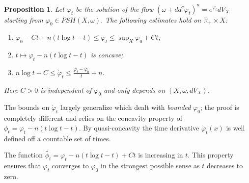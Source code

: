 \documentclass[10pt,a4paper]{amsart}
\numberwithin{equation}{section}
\newtheorem{prop}[theorem]{Proposition}
\newcommand{\R}{\mathbb R}
\newcommand{\f}{\varphi}
\begin{document}
\begin{prop} \label{pro:concave}
Let $\f_t$ be the solution of the flow $(\omega+dd^c \f_t)^n=e^{\dot{\f}_t} dV_X$ 
starting from  $\f_0 \in PSH(X,\omega)$.
The following estimates hold on $\R_+ \times X$:

\smallskip

\begin{enumerate}
\item $\f_0-Ct +n(t \log t-t) \leq \f_t \leq \sup_X \f_0 +Ct$;

\smallskip

\item $t \mapsto \f_t-n(t \log t-t)$ is concave;

\medskip

\item $n \log t -C \leq \dot{\f}_t\leq \frac{\f_t-\f_0}{t}+n$.
\end{enumerate}
Here $C>0$ is independent of $\f_0$ and only depends on $(X,\omega,dV_X)$.
\end{prop}


The bounds on $\dot{\f}_t$ largely generalize \cite[Lemma 3.2]{ST17} which dealt with {\it bounded} $\f_0$; 
the proof is  completely different and relies on the concavity property of $\phi_t=\f_t-n(t \log t-t)$.
By quasi-concavity the time derivative $\dot{\f}_t(x)$  is well defined off a countable set of times.

\smallskip

The function $\tilde{\phi_t}=\f_t-n(t \log t-t)+Ct$  is increasing in $t$.
This  property ensures that $\f_t$ converges to $\f_0$ in the strongest
possible sense as $t$ decreases to zero.
\end{document}
